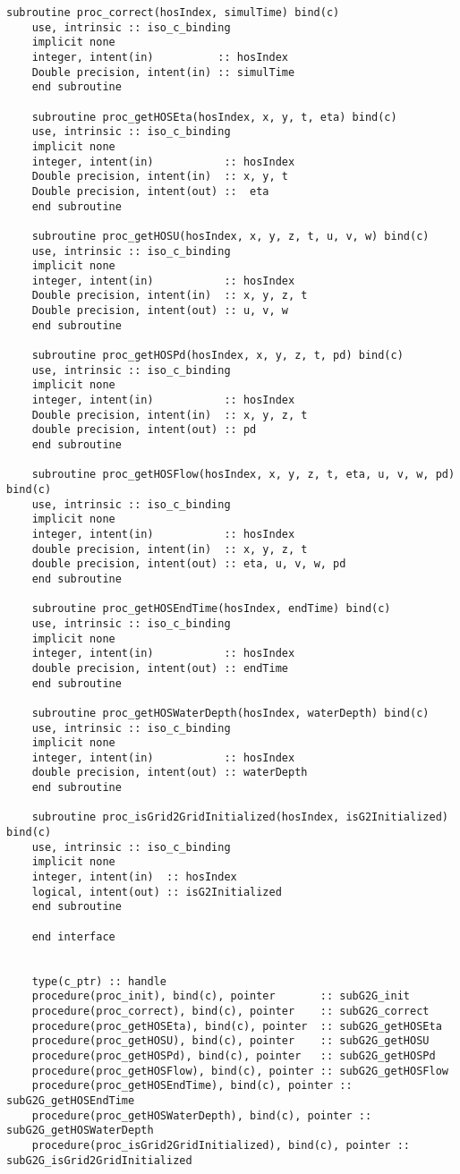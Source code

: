 \begin{lstlisting}[language={[95]Fortran}]
	subroutine proc_correct(hosIndex, simulTime) bind(c)
	use, intrinsic :: iso_c_binding
	implicit none
	integer, intent(in)          :: hosIndex
	Double precision, intent(in) :: simulTime
	end subroutine
	
	subroutine proc_getHOSEta(hosIndex, x, y, t, eta) bind(c)
	use, intrinsic :: iso_c_binding
	implicit none
	integer, intent(in)           :: hosIndex
	Double precision, intent(in)  :: x, y, t
	Double precision, intent(out) ::  eta
	end subroutine
	
	subroutine proc_getHOSU(hosIndex, x, y, z, t, u, v, w) bind(c)
	use, intrinsic :: iso_c_binding
	implicit none
	integer, intent(in)           :: hosIndex
	Double precision, intent(in)  :: x, y, z, t
	Double precision, intent(out) :: u, v, w
	end subroutine
	
	subroutine proc_getHOSPd(hosIndex, x, y, z, t, pd) bind(c)
	use, intrinsic :: iso_c_binding
	implicit none
	integer, intent(in)           :: hosIndex
	Double precision, intent(in)  :: x, y, z, t
	double precision, intent(out) :: pd
	end subroutine
	
	subroutine proc_getHOSFlow(hosIndex, x, y, z, t, eta, u, v, w, pd) bind(c)
	use, intrinsic :: iso_c_binding
	implicit none
	integer, intent(in)           :: hosIndex
	double precision, intent(in)  :: x, y, z, t
	double precision, intent(out) :: eta, u, v, w, pd
	end subroutine
	
	subroutine proc_getHOSEndTime(hosIndex, endTime) bind(c)
	use, intrinsic :: iso_c_binding
	implicit none
	integer, intent(in)           :: hosIndex
	double precision, intent(out) :: endTime
	end subroutine
	
	subroutine proc_getHOSWaterDepth(hosIndex, waterDepth) bind(c)
	use, intrinsic :: iso_c_binding
	implicit none
	integer, intent(in)           :: hosIndex
	double precision, intent(out) :: waterDepth
	end subroutine
	
	subroutine proc_isGrid2GridInitialized(hosIndex, isG2Initialized) bind(c)
	use, intrinsic :: iso_c_binding
	implicit none
	integer, intent(in)  :: hosIndex
	logical, intent(out) :: isG2Initialized
	end subroutine
	
	end interface
	
	
	type(c_ptr) :: handle
	procedure(proc_init), bind(c), pointer       :: subG2G_init
	procedure(proc_correct), bind(c), pointer    :: subG2G_correct
	procedure(proc_getHOSEta), bind(c), pointer  :: subG2G_getHOSEta
	procedure(proc_getHOSU), bind(c), pointer    :: subG2G_getHOSU
	procedure(proc_getHOSPd), bind(c), pointer   :: subG2G_getHOSPd
	procedure(proc_getHOSFlow), bind(c), pointer :: subG2G_getHOSFlow
	procedure(proc_getHOSEndTime), bind(c), pointer :: subG2G_getHOSEndTime
	procedure(proc_getHOSWaterDepth), bind(c), pointer :: subG2G_getHOSWaterDepth
	procedure(proc_isGrid2GridInitialized), bind(c), pointer :: subG2G_isGrid2GridInitialized
	

\end{lstlisting}
